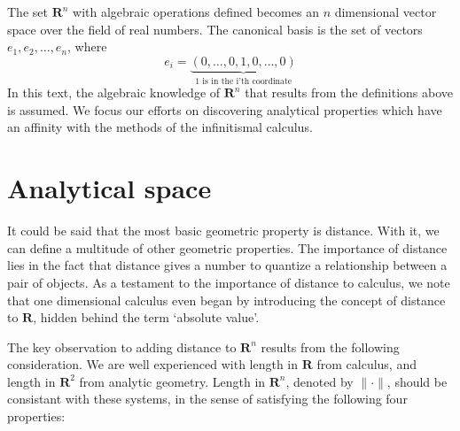 The set $\mathbf{R}^n$ with algebraic operations defined becomes an $n$ dimensional vector space over the field of real numbers. The canonical basis is the set of vectors $e_1, e_2, \dots, e_n$, where
%
\[ e_i = \underbrace{(0, \dots, 0, 1, 0, \dots, 0)}_\text{1 is in the i'th coordinate} \]
%
In this text, the algebraic knowledge of $\mathbf{R}^n$ that results from the definitions above is assumed. We focus our efforts on discovering analytical properties which have an affinity with the methods of the infinitismal calculus.






\chapter{Analytical space}

It could be said that the most basic geometric property is distance. With it, we can define a multitude of other geometric properties. The importance of distance lies in the fact that distance gives a number to quantize a relationship between a pair of objects. As a testament to the importance of distance to calculus, we note that one dimensional calculus even began by introducing the concept of distance to $\mathbf{R}$, hidden behind the term `absolute value'.

The key observation to adding distance to $\mathbf{R}^n$ results from the following consideration. We are well experienced with length in $\mathbf{R}$ from calculus, and length in $\mathbf{R}^2$ from analytic geometry. Length in $\mathbf{R}^n$, denoted by $\| \cdot \|$, should be consistant with these systems, in the sense of satisfying the following four properties:


